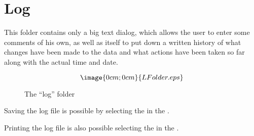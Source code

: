 \section{Log}%
\label{log.detailed}

This folder contains only a big text dialog, which allows the user to enter
some comments of his own, as well as \period itself to put down a written 
history of what changes have been made to the data and what actions have been
taken so far along with the actual time and date.

\begin{figure}[h]
$$\image{0cm;0cm}{LFolder.eps}$$
\caption{The ``log'' folder}
\end{figure}

Saving the log file is possible by selecting the  in the
.

Printing the log file is also possible selecting the  
in the .



